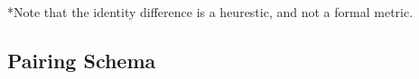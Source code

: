 \vspace{1em}

*Note that the identity difference is a heurestic, and not a formal metric.

\newpage


\subsection{Pairing Schema}



% 
% 
% 
% 



